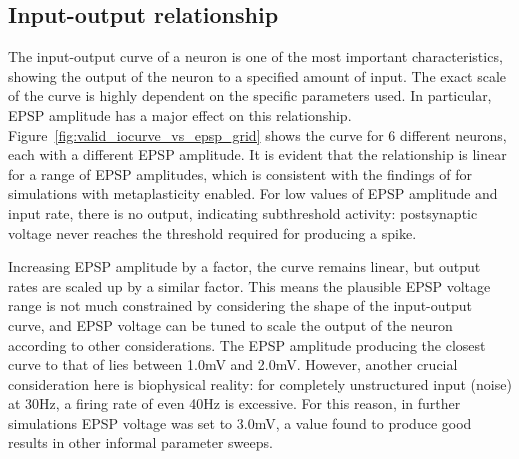 \documentclass[a4paper,12pt]{report}
\theoremstyle{definition}
\begin{document}
\subsection{Input-output relationship}
\label{subsec:iocurve}

The input-output curve of a neuron is one of the most important characteristics, showing the output of the neuron to a specified amount of input. The exact scale of the curve is highly dependent on the specific parameters used. In particular, EPSP amplitude has a major effect on this relationship. 
Figure~\ref{fig:valid_iocurve_vs_epsp_grid} shows the curve for 6 different neurons, each with a different EPSP amplitude. It is evident that the relationship is linear for a range of EPSP amplitudes, which is consistent with the findings of \cite{yeung2004synaptic} for simulations with metaplasticity enabled. For low values of EPSP amplitude and input rate, there is no output, indicating subthreshold activity: postsynaptic voltage never reaches the threshold required for producing a spike.

Increasing EPSP amplitude by a factor, the curve remains linear, but output rates are scaled up by a similar factor. This means the plausible EPSP voltage range is not much constrained by considering the shape of the input-output curve, and EPSP voltage can be tuned to scale the output of the neuron according to other considerations. The EPSP amplitude producing the closest curve to that of \cite{yeung2004synaptic} lies between 1.0mV and 2.0mV. However, another crucial consideration here is biophysical reality: for completely unstructured input (noise) at 30Hz, a firing rate of even 40Hz is excessive. For this reason, in further simulations EPSP voltage was set to 3.0mV, a value found to produce good results in other informal parameter sweeps.
\end{document}

